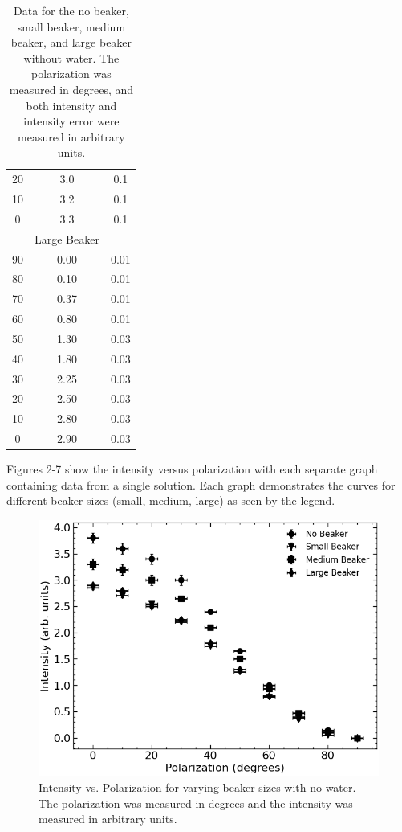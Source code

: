 \begin{table}[H]
\begin{center}
{\begin{tabular}{ccc}
			20 & 3.0 & 0.1 \\
			10 & 3.2 & 0.1 \\
			0 & 3.3 & 0.1 \\
			\hline
			& Large Beaker & \\
			\hline
			90 & 0.00 & 0.01 \\
			80 & 0.10 & 0.01 \\
			70 & 0.37 & 0.01 \\
			60 & 0.80 & 0.01 \\
			50 & 1.30 & 0.03 \\
			40 & 1.80 & 0.03 \\
			30 & 2.25 & 0.03 \\
			20 & 2.50 & 0.03 \\
			10 & 2.80 & 0.03 \\
			0 & 2.90 & 0.03 \\
			\bottomrule
		\end{tabular}}
	\end{center}
	\caption{Data for the no beaker, small beaker, medium beaker, and large beaker without water. The polarization was measured in degrees, and both intensity and intensity error were measured in arbitrary units.}
	\label{no_water_table}
\end{table}

Figures 2-7 show the intensity versus polarization with each separate graph containing data from a single solution. Each graph demonstrates the curves for different beaker sizes (small, medium, large) as seen by the legend.

\begin{figure}[H]
    \begin{center}
        \includegraphics[width=\columnwidth]{../figures/no_water.png}
    \end{center}
    \caption{Intensity vs. Polarization for varying beaker sizes with no water. The polarization was measured in degrees and the intensity was measured in arbitrary units.}
    \label{no_water_figure}
\end{figure}

